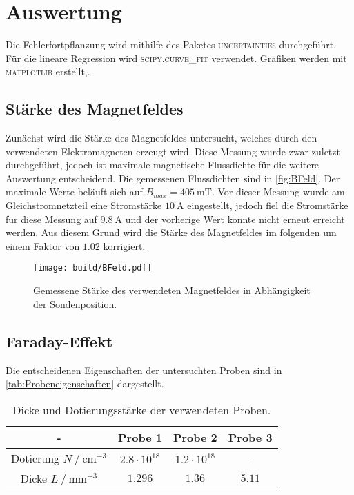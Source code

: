 \section{Auswertung}
\label{sec:auswertung}

Die Fehlerfortpflanzung wird mithilfe des Paketes \textsc{uncertainties} \cite{uncertainties} durchgeführt.
Für die lineare Regression wird \textsc{scipy.curve\_fit} \cite{scipy} verwendet.
Grafiken werden mit \textsc{matplotlib} \cite{matplotlib} erstellt,.

\subsection{Stärke des Magnetfeldes}

Zunächst wird die Stärke des Magnetfeldes untersucht, welches durch den verwendeten Elektromagneten erzeugt wird.
Diese Messung wurde zwar zuletzt durchgeführt, jedoch ist maximale magnetische Flussdichte für die weitere Auswertung entscheidend.
Die gemessenen Flussdichten sind in \autoref{fig:BFeld}.
Der maximale Werte beläuft sich auf $B_{max} = \SI{405}{\milli\tesla}$. 
Vor dieser Messung wurde am Gleichstromnetzteil eine Stromstärke $\SI{10}{\ampere}$ eingestellt, jedoch fiel die Stromstärke für diese Messung auf $\SI{9.8}{\ampere}$
und der vorherige Wert konnte nicht erneut erreicht werden.
Aus diesem Grund wird die Stärke des Magnetfeldes im folgenden um einem Faktor von $1.02$ korrigiert.

\begin{figure}[H]
    \centering
    \texttt{[image: build/BFeld.pdf]}
    \caption{Gemessene Stärke des verwendeten Magnetfeldes in Abhängigkeit der Sondenposition.}
    \label{fig:BFeld}
\end{figure}

\subsection{Faraday-Effekt}

Die entscheidenen Eigenschaften der untersuchten Proben sind in \autoref{tab:Probeneigenschaften} dargestellt.

\begin{table}[H]
    \centering
    \caption{Dicke und Dotierungsstärke der verwendeten Proben.}
    \label{tab:Probeneigenschaften}
    \begin{tabular}{c c c c}
    \toprule
      {-} & {Probe 1} & {Probe 2} & {Probe 3} \\
    \midrule
          {Dotierung $N \mathbin{/} \unit{\centi\meter^{-3}}$}  &  $2.8 \cdot 10^{18}$ & $1.2 \cdot 10^{18}$ &   {-}    \\    
          {Dicke     $L \mathbin{/} \unit{\milli\meter^{-3}}$}  &  $1.296$             & $1.36$              &   $ 5.11$\\    
    \bottomrule
    \end{tabular}
\end{table}

